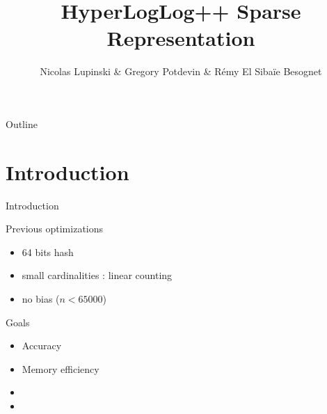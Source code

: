 \documentclass{beamer}
\title{HyperLogLog++ Sparse Representation}
\author{Nicolas Lupinski \& Gregory Potdevin \& Rémy El Sibaïe Besognet}
\begin{document}
\begin{frame}
  \titlepage  
\end{frame}

\begin{frame}{Outline}
  \tableofcontents
\end{frame}


\section{Introduction}
\begin{frame}{Introduction}

  \begin{block}{Previous optimizations}
    \begin{itemize}
      \item 64 bits hash
      \item small cardinalities : linear counting
      \item no bias ($n < 65000$)
    \end{itemize}
  \end{block}


  \begin{block}{Goals}
    \begin{itemize}
      \item Accuracy
      \item Memory efficiency
      \item {} 
      \item {} 
    \end{itemize}
  \end{block}

\end{frame}

\end{document}
